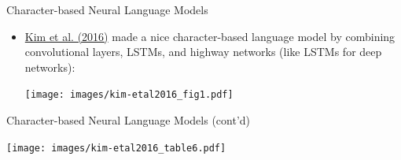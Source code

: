 \documentclass[xcolor=pdftex,x11names,table,hyperref]{beamer}
\newcommand{\conv}{convolutional}
\begin{document}
\begin{frame}{Character-based Neural Language Models}
\begin{itemize}
	\item \href{http://arxiv.org/abs/1508.06615}{Kim et al. (2016)} made a nice character-based language model by combining \conv{} layers, LSTMs, and highway networks (like LSTMs for deep networks): \\
	\begin{center}
	\texttt{[image: images/kim-etal2016\_fig1.pdf]}
	\end{center}
\end{itemize}
\end{frame}

\begin{frame}{Character-based Neural Language Models (cont'd)}
	\begin{center}
	\texttt{[image: images/kim-etal2016\_table6.pdf]}
	\end{center}
\end{frame}


\end{document}
